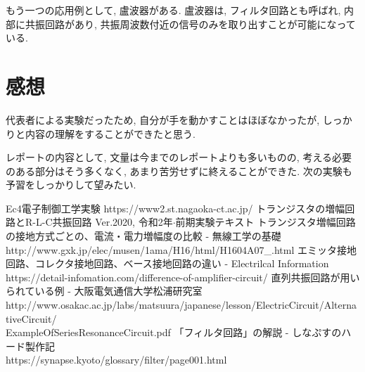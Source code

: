 \documentclass[titlepage]{jsarticle}
\begin{document}
        もう一つの応用例として, 盧波器がある.
        盧波器は, フィルタ回路とも呼ばれ, 内部に共振回路があり,
        共振周波数付近の信号のみを取り出すことが可能になっている.

\section{感想}
    代表者による実験だったため,
    自分が手を動かすことはほぼなかったが,
    しっかりと内容の理解をすることができたと思う.

    レポートの内容として,
    文量は今までのレポートよりも多いものの,
    考える必要のある部分はそう多くなく,
    あまり苦労せずに終えることができた.
    次の実験も予習をしっかりして望みたい.

\begin{thebibliography}{99}
     Ec4電子制御工学実験 https://www2.st.nagaoka-ct.ac.jp/
     トランジスタの増幅回路とR-L-C共振回路 Ver.2020, 令和2年$\cdot$前期実験テキスト
    \bibitem{} トランジスタ増幅回路の接地方式ごとの、電流・電力増幅度の比較 - 無線工学の基礎 \\ http://www.gxk.jp/elec/musen/1ama/H16/html/H1604A07\_.html
    \bibitem{} エミッタ接地回路、コレクタ接地回路、ベース接地回路の違い - Electrilcal Information \\ https://detail-infomation.com/difference-of-amplifier-circuit/
    \bibitem{} 直列共振回路が用いられている例 - 大阪電気通信大学松浦研究室 \\ http://www.osakac.ac.jp/labs/matsuura/japanese/lesson/ElectricCircuit/AlternativeCircuit/\\ExampleOfSeriesResonanceCircuit.pdf
    \bibitem{} 「フィルタ回路」の解説 - しなぷすのハード製作記 \\ https://synapse.kyoto/glossary/filter/page001.html
\end{thebibliography}
\end{document}
